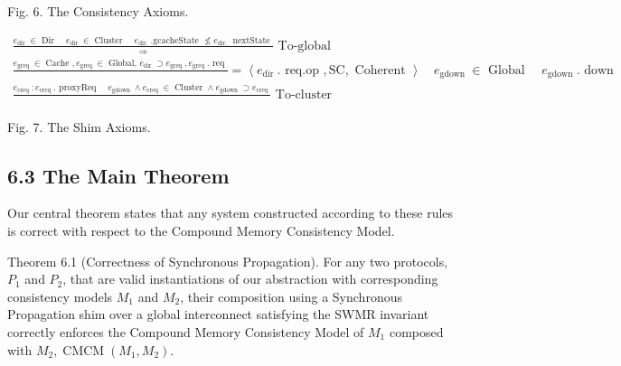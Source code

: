 \documentclass[10pt]{article}
\begin{document}
Fig. 6. The Consistency Axioms.

$$
\begin{gathered}
\frac{e_{\text {dir }} \in \text { Dir } \quad e_{\text {dir }} \in \text { Cluster } \quad e_{\text {dir. }} \text {.gcacheState } \not \leq e_{\text {dir. }} \text { nextState }}{\Rightarrow} \text { To-global } \\
\frac{e_{\text {greq }} \in \text { Cache }, e_{\text {greq }} \in \text { Global, } e_{\text {dir }} \supset e_{\text {greq }}, e_{\text {greq }} . \text { req }}{}=\left\langle e_{\text {dir }} . \text { req.op }, \mathrm{SC}, \text { Coherent }\right\rangle \quad e_{\text {gdown }} \in \text { Global } \quad e_{\text {gdown }} . \text { down } \\
\frac{e_{\text {creq }}: e_{\text {creq }} . \text { proxyReq } \quad e_{\text {gdown }} \wedge e_{\text {creq }} \in \text { Cluster } \wedge e_{\text {gdown }} \supset e_{\text {creq }}}{} \text { To-cluster }
\end{gathered}
$$

Fig. 7. The Shim Axioms.

\subsection*{6.3 The Main Theorem}
Our central theorem states that any system constructed according to these rules is correct with respect to the Compound Memory Consistency Model.

Theorem 6.1 (Correctness of Synchronous Propagation). For any two protocols, $P_{1}$ and $P_{2}$, that are valid instantiations of our abstraction with corresponding consistency models $M_{1}$ and $M_{2}$, their composition using a Synchronous Propagation shim over a global interconnect satisfying the SWMR invariant correctly enforces the Compound Memory Consistency Model of $M_{1}$ composed with $M_{2}, \operatorname{CMCM}\left(M_{1}, M_{2}\right)$.
\end{document}
